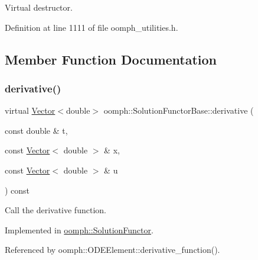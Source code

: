 Virtual destructor. 



Definition at line 1111 of file oomph\+\_\+utilities.\+h.



\subsection{Member Function Documentation}
\mbox{\label{classoomph_1_1SolutionFunctorBase_aac070b0759ba6f040020972706ed4a9b}} 
\subsubsection{\texorpdfstring{derivative()}{derivative()}}
{\footnotesize\ttfamily virtual \hyperlink{classoomph_1_1Vector}{Vector}$<$double$>$ oomph\+::\+Solution\+Functor\+Base\+::derivative (\begin{DoxyParamCaption}\item[{const double \&}]{t,  }\item[{const \hyperlink{classoomph_1_1Vector}{Vector}$<$ double $>$ \&}]{x,  }\item[{const \hyperlink{classoomph_1_1Vector}{Vector}$<$ double $>$ \&}]{u }\end{DoxyParamCaption}) const\hspace{0.3cm}{\ttfamily [pure virtual]}}



Call the derivative function. 



Implemented in \hyperlink{classoomph_1_1SolutionFunctor_a3e597c5cb36305a3a01471fadd03aee2}{oomph\+::\+Solution\+Functor}.



Referenced by oomph\+::\+O\+D\+E\+Element\+::derivative\+\_\+function().

\mbox{\label{classoomph_1_1SolutionFunctorBase_af94ed993230c9b799ce6367b436e7e9e}} 
